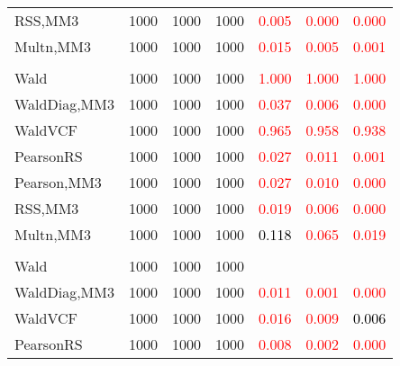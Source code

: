 \documentclass[
]{article}
\begin{document}
\begin{table}[H]
{\begin{tabular}[t]{lrrrrrr}
\hspace{1em}RSS,MM3 & 1000 & 1000 & 1000 & \textcolor{red}{0.005} & \textcolor{red}{0.000} & \textcolor{red}{0.000}\\
\hspace{1em}Multn,MM3 & 1000 & 1000 & 1000 & \textcolor{red}{0.015} & \textcolor{red}{0.005} & \textcolor{red}{0.001}\\
\addlinespace[0.3em]
\multicolumn{7}{l}{\textbf{2F 10V}}\\
\hspace{1em}Wald & 1000 & 1000 & 1000 & \textcolor{red}{1.000} & \textcolor{red}{1.000} & \textcolor{red}{1.000}\\
\hspace{1em}WaldDiag,MM3 & 1000 & 1000 & 1000 & \textcolor{red}{0.037} & \textcolor{red}{0.006} & \textcolor{red}{0.000}\\
\hspace{1em}WaldVCF & 1000 & 1000 & 1000 & \textcolor{red}{0.965} & \textcolor{red}{0.958} & \textcolor{red}{0.938}\\
\hspace{1em}PearsonRS & 1000 & 1000 & 1000 & \textcolor{red}{0.027} & \textcolor{red}{0.011} & \textcolor{red}{0.001}\\
\hspace{1em}Pearson,MM3 & 1000 & 1000 & 1000 & \textcolor{red}{0.027} & \textcolor{red}{0.010} & \textcolor{red}{0.000}\\
\hspace{1em}RSS,MM3 & 1000 & 1000 & 1000 & \textcolor{red}{0.019} & \textcolor{red}{0.006} & \textcolor{red}{0.000}\\
\hspace{1em}Multn,MM3 & 1000 & 1000 & 1000 & \textcolor{black}{0.118} & \textcolor{red}{0.065} & \textcolor{red}{0.019}\\
\addlinespace[0.3em]
\multicolumn{7}{l}{\textbf{3F 15V}}\\
\hspace{1em}Wald & 1000 & 1000 & 1000 & \textcolor{black}{} & \textcolor{black}{} & \textcolor{black}{}\\
\hspace{1em}WaldDiag,MM3 & 1000 & 1000 & 1000 & \textcolor{red}{0.011} & \textcolor{red}{0.001} & \textcolor{red}{0.000}\\
\hspace{1em}WaldVCF & 1000 & 1000 & 1000 & \textcolor{red}{0.016} & \textcolor{red}{0.009} & \textcolor{black}{0.006}\\
\hspace{1em}PearsonRS & 1000 & 1000 & 1000 & \textcolor{red}{0.008} & \textcolor{red}{0.002} & \textcolor{red}{0.000}\\

\end{tabular}}
\end{table}
\end{document}
